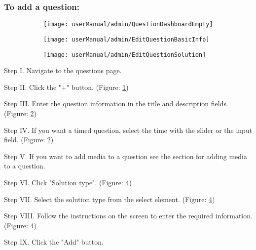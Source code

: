 \subsubsection{To add a question:}

\begin{figure}[H]
	\begin{subfigure}{0.70\linewidth}
		\texttt{[image: userManual/admin/QuestionDashboardEmpty]}
		\caption{}
		\label{fig:QuestionDashboardEmpty}
	\end{subfigure}
	\begin{subfigure}{0.70\linewidth}
		\texttt{[image: userManual/admin/EditQuestionBasicInfo]}
		\caption{}
		\label{fig:EditQuestionBasicInformation}
    \end{subfigure}
	\begin{subfigure}{0.70\linewidth}
		\texttt{[image: userManual/admin/EditQuestionSolution]}
		\caption{}
		\label{fig:EditQuestionSolution}
	\end{subfigure}
\end{figure}

\begin{userManualItemlist}
    \item[Step I.] Navigate to the questions page.
    \item[Step II.] Click the "+" button. (Figure: \ref{fig:QuestionDashboardEmpty})
    \item[Step III.] Enter the question information in the title and description fields. (Figure: \ref{fig:EditQuestionBasicInformation})
    \item[Step IV.] If you want a timed question, select the time with the slider or the input field. (Figure: \ref{fig:EditQuestionBasicInformation})
    \item[Step V.] If you want to add media to a question see the section for adding media to a question.
    \item[Step VI.] Click "Solution type". (Figure: \ref{fig:EditQuestionSolution})
    \item[Step VII.] Select the solution type from the select element. (Figure: \ref{fig:EditQuestionSolution})
    \item[Step VIII.] Follow the instructions on the screen to enter the required information. (Figure: \ref{fig:EditQuestionSolution})
    \item[Step IX.] Click the "Add" button. 
\end{userManualItemlist}

